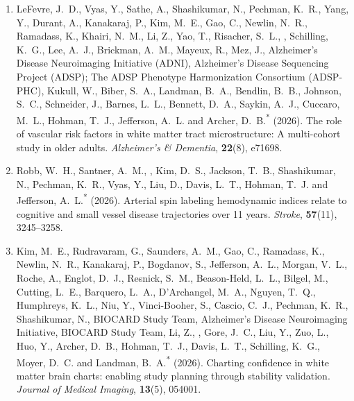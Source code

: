 \begin{enumerate}[resume=journalpubs]
\begin{pubentry}
\par\end{pubentry}
\item\begin{pubentry} LeFevre, J.\ D., Vyas, Y., Sathe, A., Shashikumar, N., Pechman, K.\ R., Yang, Y., Durant, A., Kanakaraj, P., Kim, M.\ E., Gao, C., Newlin, N.\ R., Ramadass, K., Khairi, N.\ M., Li, Z., Yao, T., Risacher, S.\ L., \PZnot{}, Schilling, K.\ G., Lee, A.\ J., Brickman, A.\ M., Mayeux, R., Mez, J., Alzheimer's Disease Neuroimaging Initiative (ADNI), Alzheimer's Disease Sequencing Project (ADSP); The ADSP Phenotype Harmonization Consortium (ADSP-PHC), Kukull, W., Biber, S.\ A., Landman, B.\ A., Bendlin, B.\ B., Johnson, S.\ C., Schneider, J., Barnes, L.\ L., Bennett, D.\ A., Saykin, A.\ J., Cuccaro, M.\ L., Hohman, T.\ J., Jefferson, A.\ L. and Archer, D.\ B.\textsuperscript{*} (2026). The role of vascular risk factors in white matter tract microstructure: A multi-cohort study in older adults. \emph{Alzheimer's \& Dementia}, \textbf{22}(8), e71698.

\par\end{pubentry}
\item\begin{pubentry} Robb, W.\ H., Santner, A.\ M., \PZnot{}, Kim, D.\ S., Jackson, T.\ B., Shashikumar, N., Pechman, K.\ R., Vyas, Y., Liu, D., Davis, L.\ T., Hohman, T.\ J. and Jefferson, A.\ L.\textsuperscript{*} (2026). Arterial spin labeling hemodynamic indices relate to cognitive and small vessel disease trajectories over 11 years. \emph{Stroke}, \textbf{57}(11), 3245--3258.

\par\end{pubentry}
\item\begin{pubentry} Kim, M.\ E., Rudravaram, G., Saunders, A.\ M., Gao, C., Ramadass, K., Newlin, N.\ R., Kanakaraj, P., Bogdanov, S., Jefferson, A.\ L., Morgan, V.\ L., Roche, A., Englot, D.\ J., Resnick, S.\ M., Beason-Held, L.\ L., Bilgel, M., Cutting, L.\ E., Barquero, L.\ A., D'Archangel, M.\ A., Nguyen, T.\ Q., Humphreys, K.\ L., Niu, Y., Vinci-Booher, S., Cascio, C.\ J., Pechman, K.\ R., Shashikumar, N., BIOCARD Study Team, Alzheimer's Disease Neuroimaging Initiative, BIOCARD Study Team, Li, Z., \PZnot{}, Gore, J.\ C., Liu, Y., Zuo, L., Huo, Y., Archer, D.\ B., Hohman, T.\ J., Davis, L.\ T., Schilling, K.\ G., Moyer, D.\ C. and Landman, B.\ A.\textsuperscript{*} (2026). Charting confidence in white matter brain charts: enabling study planning through stability validation. \emph{Journal of Medical Imaging}, \textbf{13}(5), 054001.


\end{pubentry}
\end{enumerate}
